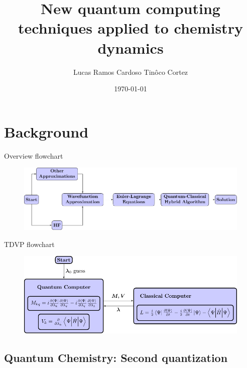 \documentclass[professionalfonts]{beamer}
\title[Dissertation defence]{New quantum computing techniques applied to chemistry dynamics}
\author{Lucas Ramos Cardoso Tin\^{o}co Cortez}
\institute{Texas Tech University}
\date{\today}
\begin{document}
\begin{frame}
	\titlepage
\end{frame}

\begin{frame}
\tableofcontents	%
\end{frame}

\section{\textbf{Background}}

\begin{frame}{Overview flowchart}
\begin{figure}[b]
	\centering
	\includegraphics[width=\textwidth]{../flowcharts/flowchart2}
\end{figure}
\end{frame}

\begin{frame}{TDVP flowchart}
\begin{figure}[b]
	\centering
	\includegraphics[width=\textwidth]{../img/variation_figure}
\end{figure}
\end{frame}

\subsection{\textbf{Quantum Chemistry: Second quantization}}
\end{document}
